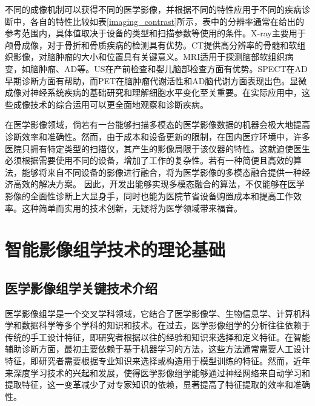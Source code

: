 不同的成像机制可以获得不同的医学影像，并根据不同的特性应用于不同的疾病诊断中，各自的特性比较如表\ref{imaging_contrast}所示，表中的分辨率通常在给出的参考范围内，具体值取决于设备的类型和扫描参数等使用的条件。X-ray主要用于颅骨成像，对于骨折和骨质疾病的检测具有优势。CT提供高分辨率的骨髓和软组织影像，对脑肿瘤的大小和位置具有关键意义。MRI适用于探测脑部软组织病变，如脑肿瘤、AD等。US在产前检查和婴儿脑部检查方面有优势。SPECT在AD早期诊断方面有帮助，而PET在脑肿瘤代谢活性和AD脑代谢方面表现出色。显微成像对神经系统疾病的基础研究和理解细胞水平变化至关重要。在实际应用中，这些成像技术的综合运用可以更全面地观察和诊断疾病。

在医学影像领域，倘若有一台能够扫描多模态的医学影像数据的机器会极大地提高诊断效率和准确性。然而，由于成本和设备更新的限制，在国内医疗环境中，许多医院只拥有特定类型的扫描仪，其产生的影像局限于该仪器的特性。这就迫使医生必须根据需要使用不同的设备，增加了工作的复杂性。若有一种简便且高效的算法，能够将来自不同设备的影像进行融合，将为医学影像的多模态融合提供一种经济高效的解决方案。
因此，开发出能够实现多模态融合的算法，不仅能够在医学影像的全面性诊断上大显身手，同时也能为医院节省设备购置成本和提高工作效率。这种简单而实用的技术创新，无疑将为医学领域带来福音。



\section{智能影像组学技术的理论基础}


\subsection{医学影像组学关键技术介绍}
医学影像组学是一个交叉学科领域，它结合了医学影像学、生物信息学、计算机科学和数据科学等多个学科的知识和技术。在过去，医学影像组学的分析往往依赖于传统的手工设计特征，即研究者根据以往的经验和知识来选择和定义特征。在智能辅助诊断方面，最初主要依赖于基于机器学习的方法，这些方法通常需要人工设计特征，即研究者需要根据专业知识来选择或构造用于模型训练的特征。然而，近年来深度学习技术的兴起和发展，使得医学影像组学能够通过神经网络来自动学习和提取特征，这一变革减少了对专家知识的依赖，显著提高了特征提取的效率和准确性。

